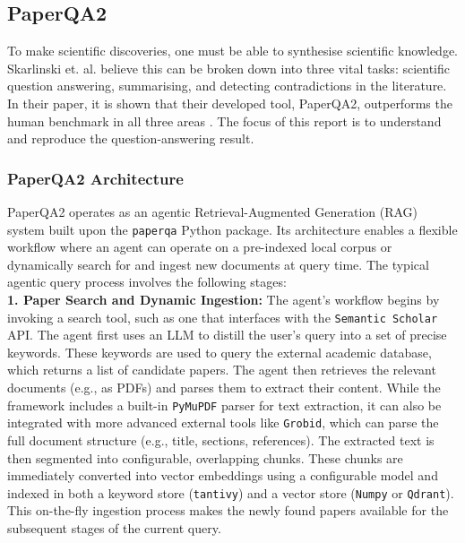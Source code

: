 \subsection{PaperQA2}
To make scientific discoveries, one must be able to synthesise scientific knowledge.
Skarlinski et. al. believe this can be broken down into three vital tasks: scientific question answering, summarising, and detecting contradictions in the literature.
In their paper, it is shown that their developed tool, PaperQA2, outperforms the human benchmark in all three areas \cite{skarlinski_language_2024}. 
The focus of this report is to understand and reproduce the question-answering result. \\

\subsubsection{PaperQA2 Architecture}
PaperQA2 operates as an agentic Retrieval-Augmented Generation (RAG) system built upon the \texttt{paperqa} Python package. Its architecture enables a flexible workflow where an agent can operate on a pre-indexed local corpus or dynamically search for and ingest new documents at query time. The typical agentic query process involves the following stages:\\

\textbf{1. Paper Search and Dynamic Ingestion:}
The agent's workflow begins by invoking a search tool, such as one that interfaces with the \texttt{Semantic Scholar} API. The agent first uses an LLM to distill the user's query into a set of precise keywords. These keywords are used to query the external academic database, which returns a list of candidate papers. The agent then retrieves the relevant documents (e.g., as PDFs) and parses them to extract their content. While the framework includes a built-in \texttt{PyMuPDF} parser for text extraction, it can also be integrated with more advanced external tools like \texttt{Grobid}, which can parse the full document structure (e.g., title, sections, references). The extracted text is then segmented into configurable, overlapping chunks. These chunks are immediately converted into vector embeddings using a configurable model and indexed in both a keyword store (\texttt{tantivy}) and a vector store (\texttt{Numpy} or \texttt{Qdrant}). This on-the-fly ingestion process makes the newly found papers available for the subsequent stages of the current query. \\

